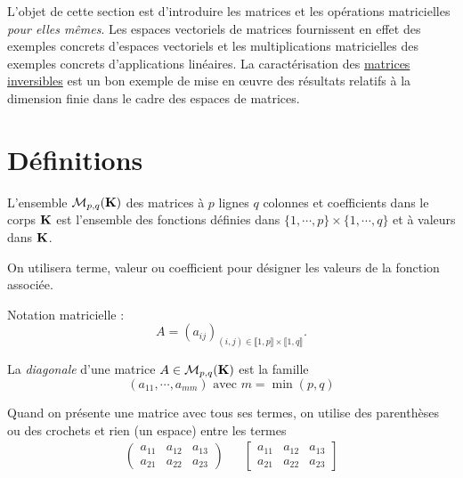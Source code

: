 

L'objet de cette section est d'introduire les matrices et les opérations matricielles \emph{pour elles mêmes}. Les espaces vectoriels de matrices fournissent en effet des exemples concrets d'espaces vectoriels et les multiplications matricielles des exemples concrets d'applications linéaires.\newline
La caractérisation des \href{#qc.caracinv}{matrices inversibles} est un bon exemple de mise en {\oe}uvre des résultats relatifs à la dimension finie dans le cadre des espaces de matrices. 

\section{Définitions}
\begin{defi}
L'ensemble $\mathcal M_{p,q}(\mathbf{K})$ des matrices à $p$ lignes $q$ colonnes et coefficients dans le corps $\mathbf{K}$ est l'ensemble des fonctions définies dans $\{1,\cdots ,p\}\times\{1,\cdots ,q\}$ et à valeurs dans $\mathbf{K}$. 
\end{defi}
On utilisera terme, valeur ou coefficient pour désigner les valeurs de la fonction associée.

Notation matricielle :
\begin{displaymath}
 A = \left(a_{ij} \right)_{(i,j)\in\llbracket 1,p \rrbracket\times\llbracket 1,q \rrbracket}. 
\end{displaymath}
\begin{defi}
 La \emph{diagonale} d'une matrice $A\in \mathcal M_{p,q}(\mathbf{K})$ est la famille
\begin{displaymath}
 (a_{11},\cdots, a_{mm})\text{ avec } m=\min(p,q)
\end{displaymath}
\end{defi}
Quand on présente une matrice avec tous ses termes, on utilise des parenthèses ou des crochets et rien (un espace) entre les termes
\begin{align*}
 \begin{pmatrix}
  a_{11}& a_{12} & a_{13} \\
  a_{21}& a_{22} & a_{23}
 \end{pmatrix}
& &
 \begin{bmatrix}
  a_{11}& a_{12} & a_{13} \\
  a_{21}& a_{22} & a_{23}
 \end{bmatrix}
\end{align*}

